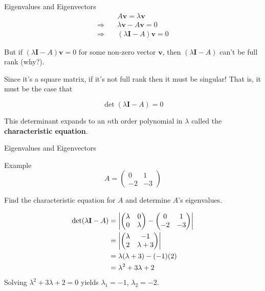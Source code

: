 \documentclass[11pt, xcolor={dvipsnames}, hyperref={colorlinks, allcolors=Blue}]{beamer}
\newcommand\bc[1]{{\usebeamercolor[fg]{frametitle} {\textbf{#1}}}} %
\renewcommand{\v}{\mathbf{v}}
\begin{document}
\begin{frame}{Eigenvalues and Eigenvectors}
\begin{align*}
 &A\v = \lambda\v \\
 \Rightarrow \quad & \lambda\v - A\v  = 0\\ 
 \Rightarrow \quad &(\lambda\mathbf{I} - A)\v = 0
\end{align*}

But if $(\lambda\mathbf{I} - A)\v = 0$ for some non-zero vector $\v$, then $(\lambda\mathbf{I} - A)$ can't be full rank (why?).\bigskip

Since it's a square matrix, if it's not full rank then it must be singular! That is, it must be the case that

\[\det(\lambda \mathbf{I} - A) = 0\]

This determinant expands to an $n$th order polynomial in $\lambda$ called the \bc{characteristic equation}.
\end{frame}
\begin{frame}{Eigenvalues and Eigenvectors}

\begin{block}{Example}
\[ A = \begin{pmatrix} 0 & 1\\ -2 & -3\end{pmatrix} \]

Find the characteristic equation for $A$ and determine $A$'s eigenvalues.

\begin{align*}
 \det(\lambda \mathbf{I} - A) &= \left | \begin{pmatrix}\lambda & 0 \\ 0 & \lambda\end{pmatrix}   - \begin{pmatrix} 0 & 1\\ -2 & -3\end{pmatrix} \right |\\
\smallskip
&= \left | \begin{pmatrix}\lambda & -1 \\ 2 & \lambda + 3\end{pmatrix} \right |\\
\smallskip
&= \lambda(\lambda+3) - (-1)(2)\\
\smallskip
&= \lambda^{2} + 3\lambda +2
\end{align*}
Solving $\lambda^{2} +3\lambda +2 = 0$ yields $\lambda_1 = -1$, $\lambda_2 = -2$.
\end{block}
\end{frame}
\end{document}

